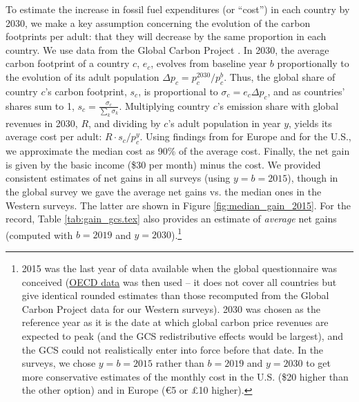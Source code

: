 To estimate the increase in fossil fuel expenditures (or ``cost'') in each country by 2030, we make a key assumption concerning the evolution of the carbon footprints per adult: that they will decrease by the same proportion %
in each country. We use data from the Global Carbon Project . 
In 2030, the average carbon footprint of a country $c$, $e_c$, evolves from baseline year $b$ proportionally to the evolution of its adult population $\Delta p_c = p^{2030}_c/p^b_c$. Thus, the global share of country $c$'s carbon footprint, $s_c$, is proportional to $\sigma_c = e_c \Delta p_c$, and as countries' shares sum to 1, $s_c = \frac{\sigma_c}{\sum_k \sigma_k}$. Multiplying country $c$'s emission share with global revenues in 2030, $R$, and dividing by $c$'s adult population in year $y$, yields its average cost per adult: $R \cdot s_c / p^y_c$. %
Using findings from  for Europe and  for the U.S., we approximate the median cost as 90\% of the average cost. Finally, the net gain is given by the basic income (\$30 per month) minus the cost. We provided consistent estimates of net gains in all surveys (using $y = b = 2015$), though in the global survey we gave the average net gains vs. the median ones in the Western surveys. The latter are shown in Figure \ref{fig:median_gain_2015}. 
For the record, Table \ref{tab:gain_gcs.tex} also provides an estimate of \textit{average} net gains (computed with $b = 2019$ and $y = 2030$).\footnote{2015 was the last year of data available when the global questionnaire was conceived (\href{https://stats.oecd.org/Index.aspx?DataSetCode=IO_GHG_2019}{OECD data} was then used -- it does not cover all countries but give identical rounded estimates than those recomputed from the Global Carbon Project data for our Western surveys). 2030 was chosen as the reference year as it is the date at which global carbon price revenues are expected to peak (and the GCS redistributive effects would be largest), and the GCS could not realistically enter into force before that date. In the surveys, we chose $y = b = 2015$ rather than $b = 2019$ and $y = 2030$ to get more conservative estimates of the monthly cost in the U.S. (\$20 higher than the other option) and in Europe (\euro{5} or £10 higher).}%

